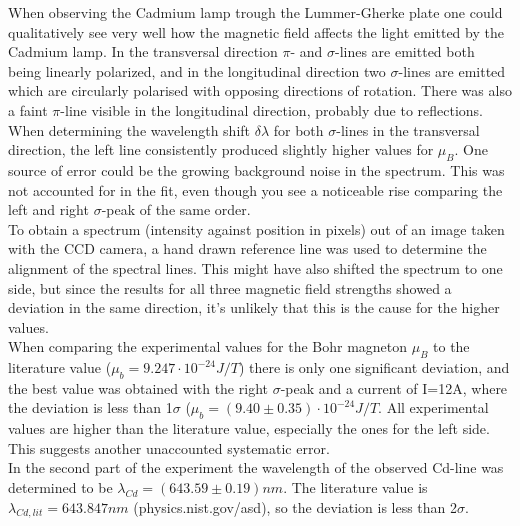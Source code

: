 \documentclass[12pt]{article}
\begin{document}
When observing the Cadmium lamp trough the Lummer-Gherke plate one could qualitatively see very well how the magnetic field affects the light emitted by the Cadmium lamp. In the transversal direction $\pi$- and $\sigma$-lines are emitted both being linearly polarized, and in the longitudinal direction two $\sigma$-lines are emitted which are circularly polarised with opposing directions of rotation. There was also a faint $\pi$-line visible in the longitudinal direction, probably due to reflections.
\\When determining the wavelength shift $\delta \lambda$ for both $\sigma$-lines in the transversal direction, the left line consistently produced slightly higher values for $\mu_B$. One source of error could be the growing background noise in the spectrum. This was not accounted for in the fit, even though you see a noticeable rise comparing the left and right $\sigma$-peak of the same order. 
\\To obtain a spectrum (intensity against position in pixels) out of an image taken with the CCD camera, a hand drawn reference line was used to determine the alignment of the spectral lines. This might have also shifted the spectrum to one side, but since the results for all three magnetic field strengths showed a deviation in the same direction, it's unlikely that this is the cause for the higher values. 
\\When comparing the experimental values for the Bohr magneton $\mu_B$ to the literature value ($\mu_b=9.247\cdot10^{-24}J/T$) there is only one significant deviation, and the best value was obtained with the right $\sigma$-peak and a current of I=12A, where the deviation is less than 1$\sigma$ ($\mu_b=(9.40\pm0.35)\cdot10^{-24}J/T$. All experimental values are higher than the literature value, especially the ones for the left side. This suggests another unaccounted systematic error.
\\In the second part of the experiment the wavelength of the observed Cd-line was determined to be $\lambda_{Cd}=(643.59\pm0.19)nm$. The literature value is $\lambda_{Cd, lit}=643.847nm$ (physics.nist.gov/asd), so the deviation is less than 2$\sigma$. 
\end{document}
